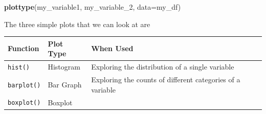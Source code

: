 \documentclass[]{book}
\newenvironment{Shaded}{\begin{snugshade}}{\end{snugshade}}
\newcommand{\KeywordTok}[1]{\textcolor[rgb]{0.13,0.29,0.53}{\textbf{#1}}}
\newcommand{\DataTypeTok}[1]{\textcolor[rgb]{0.13,0.29,0.53}{#1}}
\newcommand{\DecValTok}[1]{\textcolor[rgb]{0.00,0.00,0.81}{#1}}
\newcommand{\NormalTok}[1]{#1}
\theoremstyle{definition}
\theoremstyle{definition}
\theoremstyle{definition}
\theoremstyle{remark}
\begin{document}
\begin{Shaded}
\begin{Highlighting}[]
\KeywordTok{plottype}\NormalTok{(my_variable1, my_variable_}\DecValTok{2}\NormalTok{, }\DataTypeTok{data=}\NormalTok{my_df)}
\end{Highlighting}
\end{Shaded}

The three simple plots that we can look at are

\begin{longtable}[]{@{}lll@{}}
\toprule
\begin{minipage}[b]{0.14\columnwidth}\raggedright\strut
Function\strut
\end{minipage} & \begin{minipage}[b]{0.14\columnwidth}\raggedright\strut
Plot Type\strut
\end{minipage} & \begin{minipage}[b]{0.63\columnwidth}\raggedright\strut
When Used\strut
\end{minipage}\tabularnewline
\midrule
\endhead
\begin{minipage}[t]{0.14\columnwidth}\raggedright\strut
\texttt{hist()}\strut
\end{minipage} & \begin{minipage}[t]{0.14\columnwidth}\raggedright\strut
Histogram\strut
\end{minipage} & \begin{minipage}[t]{0.63\columnwidth}\raggedright\strut
Exploring the distribution of a single variable\strut
\end{minipage}\tabularnewline
\begin{minipage}[t]{0.14\columnwidth}\raggedright\strut
\texttt{barplot()}\strut
\end{minipage} & \begin{minipage}[t]{0.14\columnwidth}\raggedright\strut
Bar Graph\strut
\end{minipage} & \begin{minipage}[t]{0.63\columnwidth}\raggedright\strut
Exploring the counts of different categories of a variable\strut
\end{minipage}\tabularnewline
\begin{minipage}[t]{0.14\columnwidth}\raggedright\strut
\texttt{boxplot()}\strut
\end{minipage} & \begin{minipage}[t]{0.14\columnwidth}\raggedright\strut
Boxplot\strut
\end{minipage} & \begin{minipage}[t]{0.63\columnwidth}\raggedright\strut

\end{minipage}
\end{longtable}
\end{document}
